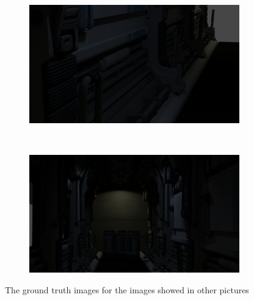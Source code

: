 \begin{figure}[h!]
    \centering
    \begin{subfigure}[b]{0.9\textwidth}
     \includegraphics[width=\textwidth]{figures/result/gt/s9_camera_9_cycles.png}
     \caption{}\label{subfig:1}
    \end{subfigure}
    \\ \vspace{0.2cm}
    \begin{subfigure}[b]{0.9\textwidth}
     \includegraphics[width=\textwidth]{figures/result/gt/s9_camera_80_cycles.png}
     \caption{}
    \end{subfigure}
    
    \caption{The ground truth images for the images showed in other pictures}
    \label{fig:gt_images}
\end{figure}

